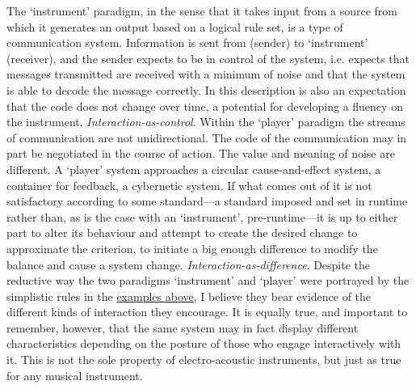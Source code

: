 The `instrument' paradigm, in the sense that it takes input from a source from which it generates an output based on a logical rule set, is a type of communication system. Information is sent from  (sender) to `instrument' (receiver), and the sender expects to be in control of the system, i.e. expects that messages transmitted are received with a minimum of noise and that the system is able to decode the message correctly. In this description is also an expectation that the code does not change over time, a potential for developing a fluency on the instrument. \emph{Interaction-as-control}. Within the `player' paradigm the streams of communication are not unidirectional. The code of the communication may in part be negotiated in the course of action. The value and meaning of noise are different. A `player' system approaches a circular cause-and-effect system, a container for feedback, a cybernetic system. If what comes out of it is not satisfactory according to some standard---a standard imposed and set in runtime rather than, as is the case with an `instrument', pre-runtime---it is up to either part to alter its behaviour and attempt to create the desired change to approximate the criterion, to initiate a big enough difference to modify the balance and cause a system change. \emph{Interaction-as-difference}. Despite the reductive way the two paradigms `instrument' and `player' were portrayed by the simplistic rules in the \hyperref[sec:inter-parad]{examples above}, I believe they bear evidence of the different kinds of interaction they encourage. It is equally true, and important to remember, however, that the same system may in fact display different characteristics depending on the posture of those who engage interactively with it. This is not the sole property of electro-acoustic instruments, but just as true for any musical instrument.



